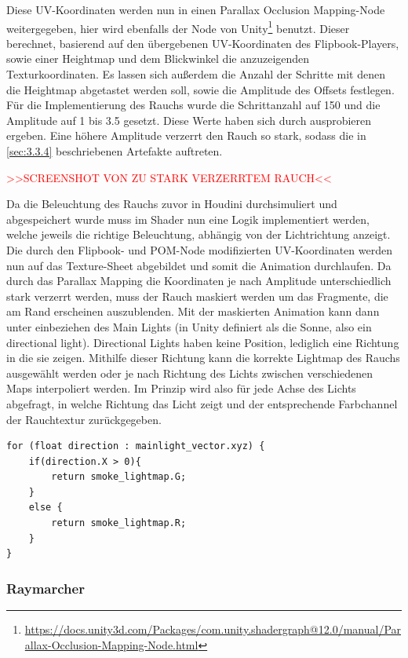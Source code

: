 Diese UV-Koordinaten werden nun in einen Parallax Occlusion Mapping-Node weitergegeben, hier wird ebenfalls der Node von Unity\footnote{\url{https://docs.unity3d.com/Packages/com.unity.shadergraph@12.0/manual/Parallax-Occlusion-Mapping-Node.html}}
benutzt. Dieser berechnet, basierend auf den übergebenen UV-Koordinaten des Flipbook-Players, sowie einer Heightmap und dem Blickwinkel die anzuzeigenden Texturkoordinaten.
Es lassen sich außerdem die Anzahl der Schritte mit denen die Heightmap abgetastet werden soll, sowie die Amplitude des Offsets festlegen.
Für die Implementierung des Rauchs wurde die Schrittanzahl auf 150 und die Amplitude auf 1 bis 3.5 gesetzt. Diese Werte haben sich durch ausprobieren ergeben.
Eine höhere Amplitude verzerrt den Rauch so stark, sodass die in \autoref{sec:3.3.4} beschriebenen Artefakte auftreten.

\textcolor{red}{>>SCREENSHOT VON ZU STARK VERZERRTEM RAUCH<<}

Da die Beleuchtung des Rauchs zuvor in Houdini durchsimuliert und abgespeichert wurde muss im Shader nun eine Logik implementiert werden, welche jeweils die richtige Beleuchtung,
abhängig von der Lichtrichtung anzeigt. Die durch den Flipbook- und POM-Node modifizierten UV-Koordinaten werden nun auf das Texture-Sheet abgebildet und somit die Animation durchlaufen.
Da durch das Parallax Mapping die Koordinaten je nach Amplitude unterschiedlich stark verzerrt werden, muss der Rauch maskiert werden um das Fragmente, die am Rand erscheinen auszublenden.
Mit der maskierten Animation kann dann unter einbeziehen des Main Lights (in Unity definiert als die Sonne, also ein directional light). Directional Lights haben keine Position,
lediglich eine Richtung in die sie zeigen. Mithilfe dieser Richtung kann die korrekte Lightmap des Rauchs ausgewählt werden oder je nach Richtung des Lichts
zwischen verschiedenen Maps interpoliert werden. Im Prinzip wird also für jede Achse des Lichts abgefragt, in welche Richtung das Licht zeigt und der entsprechende Farbchannel 
der Rauchtextur zurückgegeben. 

\begin{lstlisting}[language={[Sharp]C}]
for (float direction : mainlight_vector.xyz) {
	if(direction.X > 0){
		return smoke_lightmap.G; 
	}
	else {
		return smoke_lightmap.R;
	}
}

\end{lstlisting}


\subsubsection{Raymarcher}

